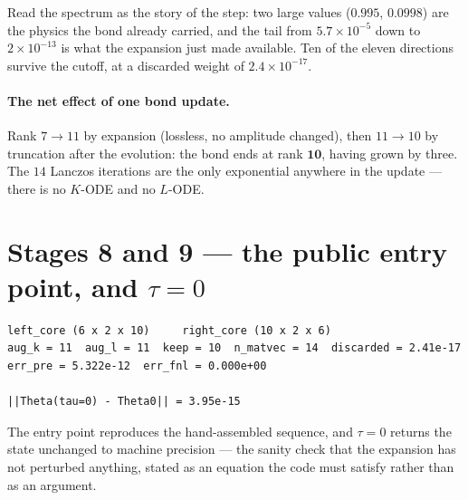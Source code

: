 \documentclass[11pt,a4paper]{article}
\begin{document}
Read the spectrum as the story of the step: two large values ($0.995$, $0.0998$) are the physics
the bond already carried, and the tail from $5.7\times10^{-5}$ down to $2\times10^{-13}$ is what
the expansion just made available. Ten of the eleven directions survive the cutoff, at a
discarded weight of $2.4\times10^{-17}$.

\paragraph{The net effect of one bond update.} Rank $7 \to 11$ by expansion (lossless, no
amplitude changed), then $11 \to 10$ by truncation after the evolution: the bond ends at rank
$\mathbf{10}$, having grown by three. The $14$ Lanczos iterations are the only exponential
anywhere in the update --- there is no $K$-ODE and no $L$-ODE.

\section{Stages 8 and 9 --- the public entry point, and $\tau = 0$}

\begin{lstlisting}
left_core (6 x 2 x 10)     right_core (10 x 2 x 6)    
aug_k = 11  aug_l = 11  keep = 10  n_matvec = 14  discarded = 2.41e-17
err_pre = 5.322e-12  err_fnl = 0.000e+00

||Theta(tau=0) - Theta0|| = 3.95e-15
\end{lstlisting}

\noindent
The entry point reproduces the hand-assembled sequence, and $\tau = 0$ returns the state
unchanged to machine precision --- the sanity check that the expansion has not perturbed
anything, stated as an equation the code must satisfy rather than as an argument.
\end{document}
